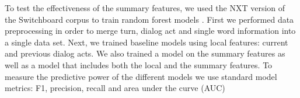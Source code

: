 To test the effectiveness of the summary features, we used the NXT version of the Switchboard corpus \cite{calhoun2010nxt,Godfrey-etal92:icassp} to train random forest models \cite{scikit-learn}. First we performed data preprocessing in order to merge turn, dialog act and single word information into a single data set. Next, we trained baseline models using local features: current and previous dialog acts. We also trained a model on the summary features as well as a model that includes both the local and the summary features. To measure the predictive power of the different models we use standard model metrics: F1, precision, recall and area under the curve (AUC)

